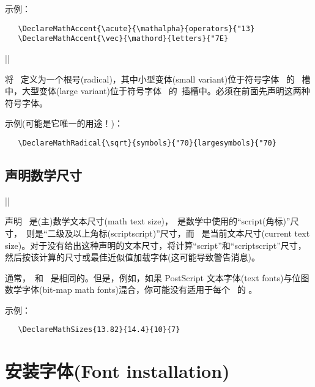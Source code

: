 \documentclass{ltxguide}[1995/11/28]
\newcommand{\heiti}{\CJKfamily{heiti}} %
\begin{document}
示例：
\begin{verbatim}
   \DeclareMathAccent{\acute}{\mathalpha}{operators}{"13}
   \DeclareMathAccent{\vec}{\mathord}{letters}{"7E}
\end{verbatim}


\begin{decl}
  |\DeclareMathRadical| 
                         \\
            \null\hfill {} 
\end{decl}

将 \ 定义为一个根号(radical)，其中小型变体(small variant)位于符号字体 \ 的 \ 槽中，大型变体(large variant)位于符号字体 \ 的\ 插槽中。必须在前面先声明这两种符号字体。

示例(可能是它唯一的用途！)：
\begin{verbatim}
   \DeclareMathRadical{\sqrt}{symbols}{"70}{largesymbols}{"70}
\end{verbatim}

\subsection[声明数学尺寸]{\heiti 声明数学尺寸}

\begin{decl}
  |\DeclareMathSizes|   
\end{decl}

声明 \ 是(主)数学文本尺寸(math text size)，\ 是数学中使用的“script(角标)”尺寸，\ 则是“二级及以上角标(scriptscript)”尺寸，而 \ 是当前文本尺寸(current text size)。对于没有给出这种声明的文本尺寸，将计算“script”和“scriptscript”尺寸，然后按该计算的尺寸或最佳近似值加载字体(这可能导致警告消息)。

通常，\ 和 \ 是相同的。但是，例如，如果 PostScript 文本字体(text fonts)与位图数学字体(bit-map math fonts)混合，你可能没有适用于每个 \ 的 。

示例：
\begin{verbatim}
   \DeclareMathSizes{13.82}{14.4}{10}{7}
\end{verbatim}

\newpage

\section{\heiti 安装字体(Font installation)}
\label{Sec:install}
\end{document}
